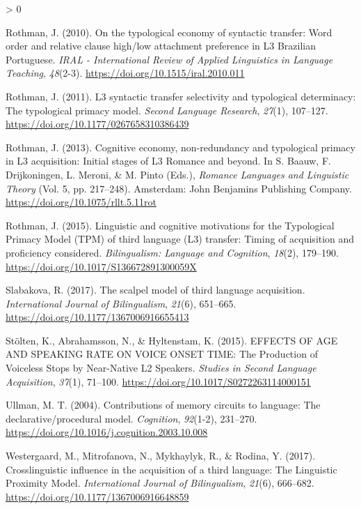 \documentclass[
  english,
  man]{apa6}
\newlength{\cslhangindent}
\newenvironment{CSLReferences}[2] %
 {%
  \setlength{\parindent}{0pt}
  \ifodd #1 \everypar{\setlength{\hangindent}{\cslhangindent}}\ignorespaces\fi
  \ifnum #2 > 0
  \setlength{\parskip}{#2\baselineskip}
  \fi
 }%
 {}
\begin{document}
\begin{CSLReferences}{1}{0}
\leavevmode\hypertarget{ref-rothman_typological_2010}{}%
Rothman, J. (2010). On the typological economy of syntactic transfer: {Word} order and relative clause high/low attachment preference in {L3} {Brazilian} {Portuguese}. \emph{IRAL - International Review of Applied Linguistics in Language Teaching}, \emph{48}(2-3). \url{https://doi.org/10.1515/iral.2010.011}

\leavevmode\hypertarget{ref-rothman_l3_2011}{}%
Rothman, J. (2011). L3 syntactic transfer selectivity and typological determinacy: {The} typological primacy model. \emph{Second Language Research}, \emph{27}(1), 107--127. \url{https://doi.org/10.1177/0267658310386439}

\leavevmode\hypertarget{ref-baauw_cognitive_2013}{}%
Rothman, J. (2013). Cognitive economy, non-redundancy and typological primacy in {L3} acquisition: {Initial} stages of {L3} {Romance} and beyond. In S. Baauw, F. Drijkoningen, L. Meroni, \& M. Pinto (Eds.), \emph{Romance {Languages} and {Linguistic} {Theory}} (Vol. 5, pp. 217--248). Amsterdam: John Benjamins Publishing Company. \url{https://doi.org/10.1075/rllt.5.11rot}

\leavevmode\hypertarget{ref-rothman_linguistic_2015}{}%
Rothman, J. (2015). Linguistic and cognitive motivations for the {Typological} {Primacy} {Model} ({TPM}) of third language ({L3}) transfer: {Timing} of acquisition and proficiency considered. \emph{Bilingualism: Language and Cognition}, \emph{18}(2), 179--190. \url{https://doi.org/10.1017/S136672891300059X}

\leavevmode\hypertarget{ref-slabakova_scalpel_2017}{}%
Slabakova, R. (2017). The scalpel model of third language acquisition. \emph{International Journal of Bilingualism}, \emph{21}(6), 651--665. \url{https://doi.org/10.1177/1367006916655413}

\leavevmode\hypertarget{ref-stolten_effects_2015}{}%
Stölten, K., Abrahamsson, N., \& Hyltenstam, K. (2015). {EFFECTS} {OF} {AGE} {AND} {SPEAKING} {RATE} {ON} {VOICE} {ONSET} {TIME}: {The} {Production} of {Voiceless} {Stops} by {Near}-{Native} {L2} {Speakers}. \emph{Studies in Second Language Acquisition}, \emph{37}(1), 71--100. \url{https://doi.org/10.1017/S0272263114000151}

\leavevmode\hypertarget{ref-ullman_contributions_2004}{}%
Ullman, M. T. (2004). Contributions of memory circuits to language: The declarative/procedural model. \emph{Cognition}, \emph{92}(1-2), 231--270. \url{https://doi.org/10.1016/j.cognition.2003.10.008}

\leavevmode\hypertarget{ref-westergaard_crosslinguistic_2017}{}%
Westergaard, M., Mitrofanova, N., Mykhaylyk, R., \& Rodina, Y. (2017). Crosslinguistic influence in the acquisition of a third language: {The} {Linguistic} {Proximity} {Model}. \emph{International Journal of Bilingualism}, \emph{21}(6), 666--682. \url{https://doi.org/10.1177/1367006916648859}


\end{CSLReferences}
\end{document}
